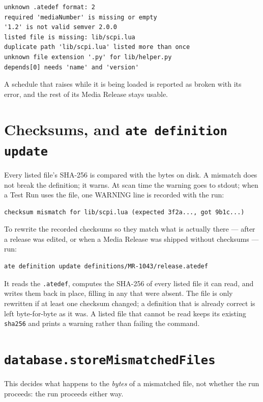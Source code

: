 \begin{lstlisting}[language=ATEShell]
unknown .atedef format: 2
required 'mediaNumber' is missing or empty
'1.2' is not valid semver 2.0.0
listed file is missing: lib/scpi.lua
duplicate path 'lib/scpi.lua' listed more than once
unknown file extension '.py' for lib/helper.py
depends[0] needs 'name' and 'version'
\end{lstlisting}

A schedule that raises while it is being loaded is reported as broken with its error, and the rest
of its Media Release stays usable.

\section{Checksums, and \texttt{ate definition update}}

Every listed file's SHA-256 is compared with the bytes on disk. A mismatch does not break the
definition; it warns. At scan time the warning goes to stdout; when a Test Run uses the file, one
WARNING line is recorded with the run:

\begin{lstlisting}[language=ATEShell]
checksum mismatch for lib/scpi.lua (expected 3f2a..., got 9b1c...)
\end{lstlisting}

To rewrite the recorded checksums so they match what is actually there --- after a release was
edited, or when a Media Release was shipped without checksums --- run:

\begin{lstlisting}[language=ATEShell]
ate definition update definitions/MR-1043/release.atedef
\end{lstlisting}

It reads the \texttt{.atedef}, computes the SHA-256 of every listed file it can read, and writes
them back in place, filling in any that were absent. The file is only rewritten if at least one
checksum changed; a definition that is already correct is left byte-for-byte as it was. A listed
file that cannot be read keeps its existing \texttt{sha256} and prints a warning rather than
failing the command.

\section{\texttt{database.storeMismatchedFiles}}

This decides what happens to the \emph{bytes} of a mismatched file, not whether the run proceeds:
the run proceeds either way.

